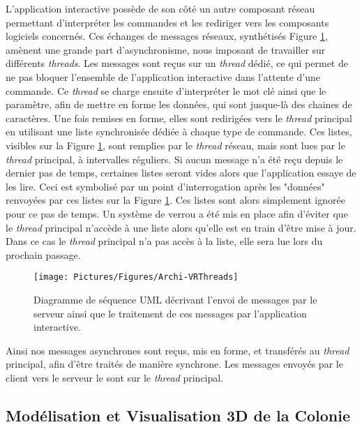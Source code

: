 	L'application interactive possède de son côté un autre composant réseau permettant d'interpréter les commandes et les rediriger vers les composants logiciels concernés. Ces échanges de messages réseaux, synthétisés Figure \ref{VRThreads}, amènent une grande part d'asynchronisme, nous imposant de travailler sur différents \textit{threads}. Les messages sont reçus sur un \textit{thread} dédié, ce qui permet de ne pas bloquer l'ensemble de l'application interactive dans l'attente d'une commande. Ce \textit{thread} se charge ensuite d'interpréter le mot clé ainsi que le paramètre, afin de mettre en forme les données, qui sont jusque-là des chaines de caractères. Une fois remises en forme, elles sont redirigées vers le \textit{thread} principal en utilisant une liste synchronisée dédiée à chaque type de commande. Ces listes, visibles sur la Figure \ref{VRThreads}, sont remplies par le \textit{thread} réseau, mais sont lues par le \textit{thread} principal, à intervalles réguliers. 
	Si aucun message n'a été reçu depuis le dernier pas de temps, certaines listes seront vides alors que l'application essaye de les lire. Ceci est symbolisé par un point d'interrogation après les "données" renvoyées par ces listes sur la Figure \ref{VRThreads}. Ces listes sont alors simplement ignorée pour ce pas de temps. 
	Un système de verrou a été mis en place afin d'éviter que le \textit{thread} principal n'accède à une liste alors qu'elle est en train d'être mise à jour. Dans ce cas le \textit{thread} principal n'a pas accès à la liste, elle sera lue lors du prochain passage.
	
	\begin{figure}
		\texttt{[image: Pictures/Figures/Archi-VRThreads]}
		\caption{Diagramme de séquence UML décrivant l'envoi de messages par le serveur ainsi que le traitement de ces messages par l'application interactive.}
		\label{VRThreads}
	\end{figure}
	
	Ainsi nos messages asynchrones sont reçus, mis en forme, et transférés au \textit{thread} principal, afin d'être traités de manière synchrone. Les messages envoyés par le client vers le serveur le sont sur le \textit{thread} principal.
	
	\subsection{Modélisation et Visualisation 3D de la Colonie}		
	
